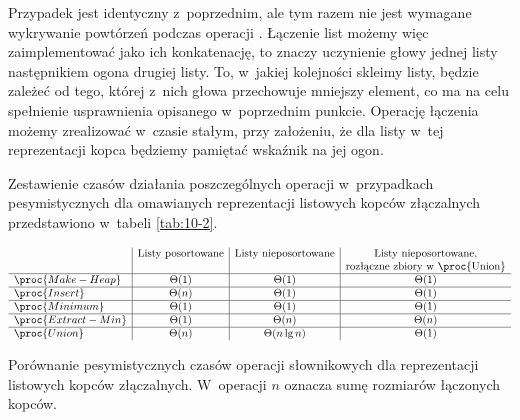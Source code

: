 \subproblem %
Przypadek jest identyczny z~poprzednim, ale tym razem nie jest wymagane wykrywanie powtórzeń podczas operacji .
Łączenie list możemy więc zaimplementować jako ich konkatenację, to znaczy uczynienie głowy jednej listy następnikiem ogona drugiej listy.
To, w~jakiej kolejności skleimy listy, będzie zależeć od tego, której z~nich głowa przechowuje mniejszy element, co ma na celu spełnienie usprawnienia opisanego w~poprzednim punkcie.
Operację łączenia możemy zrealizować w~czasie stałym, przy założeniu, że dla listy w~tej reprezentacji kopca będziemy pamiętać wskaźnik na jej ogon.

\bigskip
\noindent Zestawienie czasów działania poszczególnych operacji w~przypadkach pesymistycznych dla omawianych reprezentacji listowych kopców złączalnych przedstawiono w~tabeli \ref{tab:10-2}.

\begin{table}[!ht]
	\centering
		\[
			\begin{array}{l|c|c|c}
				& \text{Listy posortowane} & \text{Listy nieposortowane} & \text{Listy nieposortowane,} \\
				&  &  & \text{rozłączne zbiory w~\proc{Union}} \\
				\hline
				\proc{Make-Heap} & \Theta(1) & \Theta(1) & \Theta(1) \\
				\hline
				\proc{Insert} & \Theta(n) & \Theta(1) & \Theta(1) \\
				\hline
				\proc{Minimum} & \Theta(1) & \Theta(1) & \Theta(1) \\
				\hline
				\proc{Extract-Min} & \Theta(1) & \Theta(n) & \Theta(n) \\
				\hline
				\proc{Union} & \Theta(n) & \Theta(n\lg n) & \Theta(1)
			\end{array}
		\]
	\caption{Porównanie pesymistycznych czasów operacji słownikowych dla reprezentacji listowych kopców złączalnych.
W~operacji  $n$ oznacza sumę rozmiarów łączonych kopców.} \label{tab:10-2}
\end{table}
